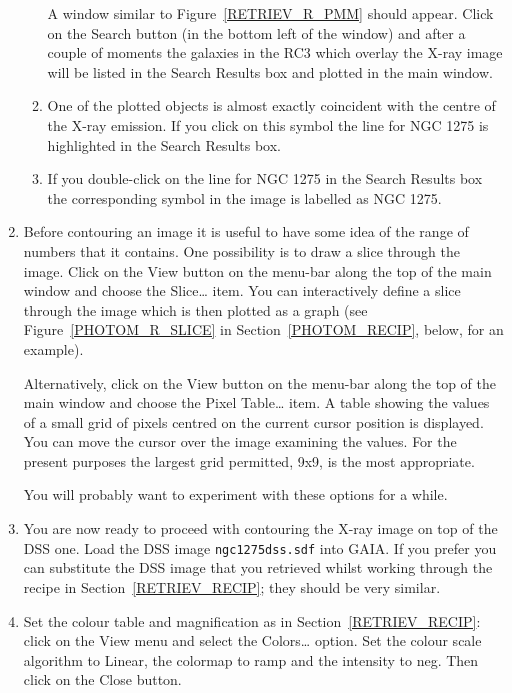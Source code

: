 \documentclass[twoside,11pt]{article}
\begin{document}
\begin{enumerate}
\begin{enumerate}
     A window similar to Figure~\ref{RETRIEV_R_PMM} should appear.  Click
     on the {\sf Search} button (in the bottom left of the window) and
     after a couple of moments the galaxies in the RC3 which overlay the
     X-ray image will be listed in the {\sf Search Results} box and plotted
     in the main window.

    \item One of the plotted objects is almost exactly coincident with the
     centre of the X-ray emission.  If you click on this symbol the line
     for NGC 1275 is highlighted in the {\sf Search Results} box.

    \item If you double-click on the line for NGC 1275 in the {\sf Search
     Results} box the corresponding symbol in the image is labelled as
     NGC 1275.

  \end{enumerate}

  \item Before contouring an image it is useful to have some idea of the
   range of numbers that it contains.  One possibility is to draw a slice
   through the image.  Click on the {\sf View} button on the menu-bar
   along the top of the main window and choose the {\sf Slice\ldots} item.
   You can interactively define a slice through the image which is then
   plotted as a graph (see Figure~\ref{PHOTOM_R_SLICE} in
   Section~\ref{PHOTOM_RECIP}, below, for an example).

   Alternatively, click on the {\sf View} button on the menu-bar
   along the top of the main window and choose the {\sf Pixel Table\ldots}
   item.  A table showing the values of a small grid of pixels centred on
   the current  cursor position is displayed.  You can move the cursor over
   the image examining the values.  For the present purposes the largest
   grid permitted, {\sf 9x9}, is the most appropriate.

   You will probably want to experiment with these options for a while.

  \item You are now ready to proceed with contouring the X-ray image on top
   of the DSS one.  Load the DSS image {\tt ngc1275dss.sdf} into GAIA.  If
   you prefer you can substitute the DSS image that you retrieved whilst
   working through the recipe in Section~\ref{RETRIEV_RECIP}; they should
   be very similar.

  \item Set the colour table and magnification as in
   Section~\ref{RETRIEV_RECIP}: click on the {\sf View} menu and select
   the {\sf Colors\ldots} option.  Set the colour scale algorithm to {\sf
   Linear}, the colormap to {\sf ramp} and the intensity to {\sf neg}.
   Then click on the {\sf Close} button.


\end{enumerate}
\end{document}
